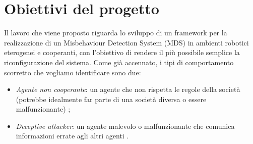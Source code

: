 \documentclass[paper=a4, fontsize=11pt]{scrartcl} %
\numberwithin{equation}{section} %
\numberwithin{table}{section} %
\begin{document}
\section{Obiettivi del progetto}
Il lavoro che viene proposto riguarda lo sviluppo di un framework per la realizzazione di un Misbehaviour Detection System (MDS) in ambienti robotici eterogenei e cooperanti, con l'obiettivo di rendere il più possibile
semplice la riconfigurazione del sistema. Come già accennato, i tipi di 
comportamento scorretto che vogliamo identificare sono due: 
\begin{itemize}
\item \textit{Agente non cooperante}: un agente che non rispetta le regole della società (potrebbe idealmente far parte di una società diversa o 
essere malfunzionante) \cite{ram10-bfp};
\item \textit{Deceptive attacker}: un agente malevolo o malfunzionante che comunica informazioni
errate agli altri agenti \cite{Pasqualetti_attackdetection}. 
\end{itemize}
\end{document}
